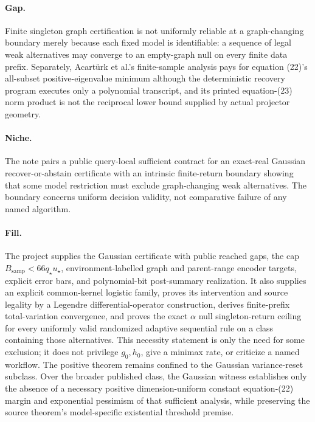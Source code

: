 \documentclass{article}
\begin{document}
\paragraph{Gap.} Finite singleton graph certification is not uniformly reliable at a graph-changing boundary merely because each fixed model is identifiable: a sequence of legal weak alternatives may converge to an empty-graph null on every finite data prefix. Separately, Acartürk et al.'s finite-sample analysis pays for equation (22)'s all-subset positive-eigenvalue minimum although the deterministic recovery program executes only a polynomial transcript, and its printed equation-(23) norm product is not the reciprocal lower bound supplied by actual projector geometry.

\paragraph{Niche.} The note pairs a public query-local sufficient contract for an exact-real Gaussian recover-or-abstain certificate with an intrinsic finite-return boundary showing that some model restriction must exclude graph-changing weak alternatives. The boundary concerns uniform decision validity, not comparative failure of any named algorithm.

\paragraph{Fill.} The project supplies the Gaussian certificate with public reached gaps, the cap \(B_{\mathrm{samp}}<66q_{\star}u_{\star}\), environment-labelled graph and parent-range encoder targets, explicit error bars, and polynomial-bit post-summary realization. It also supplies an explicit common-kernel logistic family, proves its intervention and source legality by a Legendre differential-operator construction, derives finite-prefix total-variation convergence, and proves the exact \(\alpha\) null singleton-return ceiling for every uniformly valid randomized adaptive sequential rule on a class containing those alternatives. This necessity statement is only the need for some exclusion; it does not privilege \(g_0,h_0\), give a minimax rate, or criticize a named workflow. The positive theorem remains confined to the Gaussian variance-reset subclass. Over the broader published class, the Gaussian witness establishes only the absence of a necessary positive dimension-uniform constant equation-(22) margin and exponential pessimism of that sufficient analysis, while preserving the source theorem's model-specific existential threshold premise.
\end{document}
